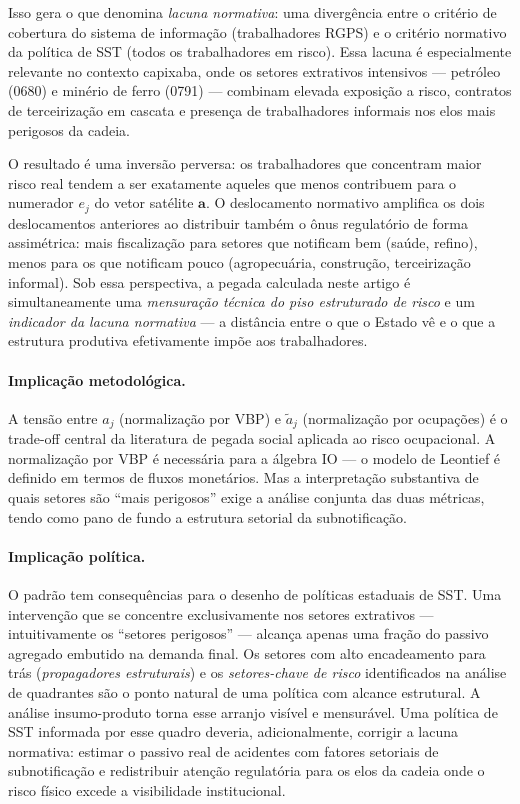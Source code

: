 \documentclass[12pt, a4paper]{article}
\begin{document}
Isso gera o que \citet{hitzig2020normative} denomina \textit{lacuna
normativa}: uma divergência entre o critério de cobertura do sistema
de informação (trabalhadores RGPS) e o critério normativo da política
de SST (todos os trabalhadores em risco). Essa lacuna é especialmente
relevante no contexto capixaba, onde os setores extrativos intensivos
--- petróleo (0680) e minério de ferro (0791) --- combinam elevada
exposição a risco, contratos de terceirização em cascata e presença de
trabalhadores informais nos elos mais perigosos da cadeia.

O resultado é uma inversão perversa: os trabalhadores que concentram
maior risco real tendem a ser exatamente aqueles que menos contribuem
para o numerador $e_j$ do vetor satélite $\mathbf{a}$. O deslocamento
normativo amplifica os dois deslocamentos anteriores ao distribuir
também o ônus regulatório de forma assimétrica: mais fiscalização para
setores que notificam bem (saúde, refino), menos para os que notificam
pouco (agropecuária, construção, terceirização informal). Sob essa
perspectiva, a pegada calculada neste artigo é simultaneamente uma
\textit{mensuração técnica do piso estruturado de risco} e um
\textit{indicador da lacuna normativa} --- a distância entre o que o
Estado vê e o que a estrutura produtiva efetivamente impõe aos
trabalhadores.

\paragraph{Implicação metodológica.}
A tensão entre $a_j$ (normalização por VBP) e $\tilde{a}_j$
(normalização por ocupações) é o trade-off central da literatura de
pegada social aplicada ao risco ocupacional. A normalização por VBP
é necessária para a álgebra IO --- o modelo de Leontief é definido
em termos de fluxos monetários. Mas a interpretação substantiva de
quais setores são ``mais perigosos'' exige a análise conjunta das
duas métricas, tendo como pano de fundo a estrutura setorial da
subnotificação.

\paragraph{Implicação política.}
O padrão tem consequências para o desenho de políticas estaduais de
SST. Uma intervenção que se concentre exclusivamente nos setores
extrativos --- intuitivamente os ``setores perigosos'' --- alcança
apenas uma fração do passivo agregado embutido na demanda final. Os
setores com alto encadeamento para trás (\textit{propagadores
estruturais}) e os \textit{setores-chave de risco} identificados na
análise de quadrantes são o ponto natural de uma política com alcance
estrutural. A análise insumo-produto torna esse arranjo visível e
mensurável. Uma política de SST informada por esse quadro deveria,
adicionalmente, corrigir a lacuna normativa: estimar o passivo real
de acidentes com fatores setoriais de subnotificação e redistribuir
atenção regulatória para os elos da cadeia onde o risco físico excede
a visibilidade institucional.
\end{document}
